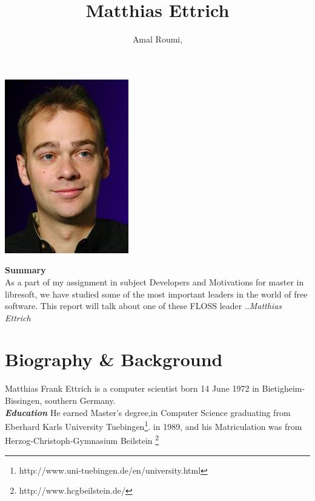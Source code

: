 \documentclass[DIV=calc, paper=a4, fontsize=11pt]{scrartcl}
\title{Matthias Ettrich}
\author {Amal Roumi,}
\date{}
\begin{document}
\maketitle
\thispagestyle{fancy} %

\begin{center}\includegraphics[scale=1.5]{index.jpeg} \end{center}

\abstract
\textbf{Summary} \\
 
As a part of my assignment in subject Developers and Motivations for master in libresoft, we have studied some of the most important leaders in the world of free software.
 This report will talk  about one of these FLOSS leader ..\emph{Matthias Ettrich}
 

\tableofcontents
 \newpage

\section{Biography \& Background}

Matthias Frank Ettrich is a computer scientist born 14 June 1972 in Bietigheim-Bissingen, southern Germany.\\

{\Large \textbf{\emph{Education}}}
He earned  Master's degree,in Computer Science graduating from Eberhard Karls University Tuebingen\footnote{http://www.uni-tuebingen.de/en/university.html}. in 1989, and his Matriculation was from  Herzog-Christoph-Gymnasium Beilstein \footnote {http://www.hcgbeilstein.de/}\\
\end{document}

